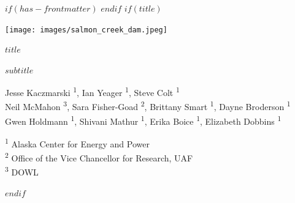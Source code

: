 
$if(has-frontmatter)$
\frontmatter
$endif$
$if(title)$
\cleardoublepage
\thispagestyle{empty}
{\centering

\vspace*{-3cm}


\vspace{5ex}

\par\noindent\hspace*{-1cm}\texttt{[image: images/salmon\_creek\_dam.jpeg]}

\vspace{5ex}


{\huge\bfseries\color{uafblue} $title$ \par}
\vspace{2ex}
{\large\bfseries\color{uafblue} $subtitle$ \par}

\vspace{5ex}

{\normalsize
  Jesse Kaczmarski \textsuperscript{1}, 
  Ian Yeager \textsuperscript{1}, 
  Steve Colt \textsuperscript{1}\\
  Neil McMahon \textsuperscript{3}, 
  Sara Fisher-Goad \textsuperscript{2}, 
  Brittany Smart \textsuperscript{1}, 
  Dayne Broderson \textsuperscript{1} \\
  Gwen Holdmann \textsuperscript{1}, 
  Shivani Mathur \textsuperscript{1}, 
  Erika Boice \textsuperscript{1},
  Elizabeth Dobbins \textsuperscript{1}}

\vspace{5ex}

{\large
  \textsuperscript{1} Alaska Center for Energy and Power \\
  \textsuperscript{2} Office of the Vice Chancellor for Research, UAF \\
  \textsuperscript{3} DOWL}


}
$endif$


